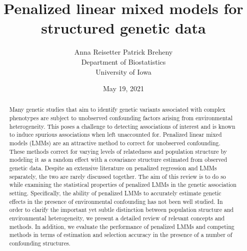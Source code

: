 \documentclass{article}
\title{Penalized linear mixed models for structured genetic data}
\author{Anna Reisetter \qquad Patrick Breheny\\
  Department of Biostatistics\\University of Iowa}
\date{May 19, 2021}
\begin{document}
\maketitle

\begin{abstract}
Many genetic studies that aim to identify genetic variants associated with complex phenotypes are subject to unobserved confounding factors arising from environmental heterogeneity. This poses a challenge to detecting associations of interest and is known to induce spurious associations when left unaccounted for. Penalized linear mixed models (LMMs) are an attractive method to correct for unobserved confounding. These methods correct for varying levels of relatedness and population structure by modeling it as a random effect with a covariance structure estimated from observed genetic data. Despite an extensive literature on penalized regression and LMMs separately, the two are rarely discussed together. The aim of this review is to do so while examining the statistical properties of penalized LMMs in the genetic association setting. Specifically, the ability of penalized LMMs to accurately estimate genetic effects in the presence of environmental confounding has not been well studied. In order to clarify the important yet subtle distinction between population structure and environmental heterogeneity, we present a detailed review of relevant concepts and methods. In addition, we evaluate the performance of penalized LMMs and competing methods in terms of estimation and selection accuracy in the presence of a number of confounding structures.
\end{abstract}



\newpage


\end{document}
